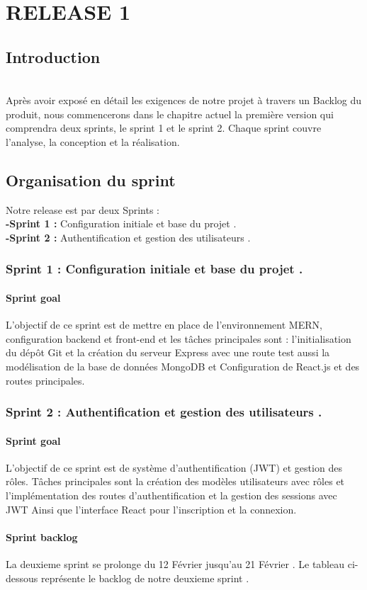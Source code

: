 \chapter{RELEASE 1}

 


\section*{Introduction}\\
Après avoir exposé en détail les exigences de notre projet à travers un Backlog du produit, nous commencerons dans le chapitre actuel la première version qui comprendra deux sprints, le sprint 1 et le sprint 2. Chaque sprint couvre l’analyse, la conception et la réalisation.
\section{Organisation du sprint}
Notre release est par deux Sprints :\\
\textbf{-Sprint 1 :} Configuration initiale et base du projet .\\
\textbf{-Sprint 2 :} Authentification et gestion des utilisateurs .
\subsection{Sprint 1 : Configuration initiale et base du projet .}
\subsubsection{Sprint goal}
  L'objectif de ce sprint est de mettre en place de l'environnement MERN, configuration backend et front-end et les tâches principales sont :
l'initialisation du dépôt Git
et la création du serveur Express avec une route test
aussi la modélisation de la base de données MongoDB
 et Configuration de React.js et des routes principales.\\
  \subsection{ Sprint 2 : Authentification et gestion des utilisateurs .}
  \subsubsection{Sprint goal}
  L'objectif de ce sprint est de système d'authentification (JWT) et gestion des rôles.  Tâches principales sont la création des modèles utilisateurs avec rôles et 
l'implémentation des routes d'authentification et la gestion des sessions avec JWT
Ainsi que l'interface React pour l'inscription et la connexion.
\subsubsection{Sprint backlog }
La deuxieme sprint se prolonge du 12 Février jusqu'au 21 Février . Le tableau ci-dessous représente le backlog de notre deuxieme sprint . 

